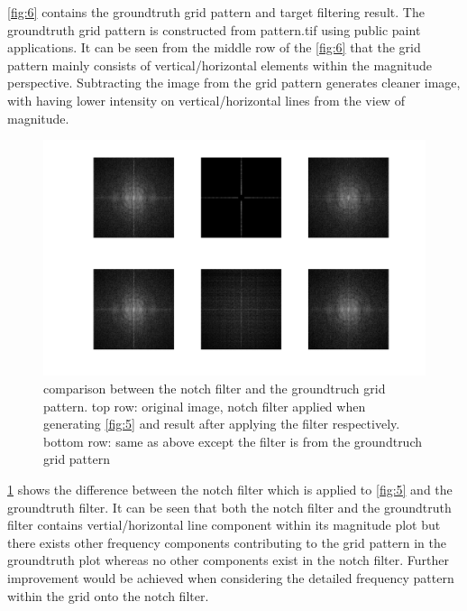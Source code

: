 \documentclass[extendedabs]{bmvc2k}
\begin{document}
\figurename{\ref{fig:6}} contains the groundtruth grid pattern and target filtering result.
The groundtruth grid pattern is constructed from pattern.tif using public paint applications.
It can be seen from the middle row of the \figurename{\ref{fig:6}} that the grid pattern mainly consists
of vertical/horizontal elements within the magnitude perspective. Subtracting the image from the
grid pattern generates cleaner image, with having lower intensity on vertical/horizontal lines from
the view of magnitude.

\begin{figure}[h]
    \centering
    \includegraphics[width=\linewidth]{hw3_4_3}
    \caption{comparison between the notch filter and the groundtruch grid pattern. top row: original image,
    notch filter applied when generating \figurename{\ref{fig:5}} and result after applying the filter 
    respectively. bottom row: same as above except the filter is from the groundtruch grid pattern}
    \label{fig:7}
\end{figure}

\figurename{\ref{fig:7}} shows the difference between the notch filter which is applied to 
\figurename{\ref{fig:5}} and the groundtruth filter. It can be seen that both the notch
filter and the groundtruth filter contains vertial/horizontal line component within its
magnitude plot but there exists other frequency components contributing to the grid pattern
in the groundtruth plot whereas no other components exist in the notch filter.
Further improvement would be achieved when considering the detailed frequency pattern 
within the grid onto the notch filter.
\end{document}
